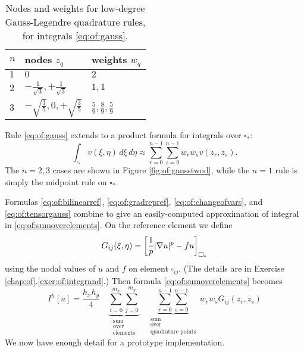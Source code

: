 \begin{table}[h]
\vspace{0.1in}

\begin{tabular}{lll}
$n$\phantom{foobar} & nodes $z_q$\phantom{foo} & weights $w_q$ \\ \hline
$1$ & $0$ & $2$ \\
$2$ & $-\frac{1}{\sqrt{3}}, +\frac{1}{\sqrt{3}}$ & $1,1$ \\
$3$ & $-\sqrt{\frac{3}{5}}, 0, +\sqrt{\frac{3}{5}}$ & $\frac{5}{9}, \frac{8}{9}, \frac{5}{9}$ \\
\end{tabular}

\vspace{0.1in}
\caption{Nodes and weights for low-degree Gauss-Legendre quadrature rules, for integrals \eqref{eq:of:gauss}.} \label{tab:of:gauss}
\end{table}

Rule \eqref{eq:of:gauss} extends to a product formula for integrals over $\square_\ast$:
\begin{equation}
\int_{\square_\ast} v(\xi,\eta) \,d\xi\,d\eta \approx \sum_{r=0}^{n-1} \sum_{s=0}^{n-1} w_r w_s v(z_r,z_s).  \label{eq:of:tensorgauss}
\end{equation}
The $n=2,3$ cases are shown in Figure \ref{fig:of:gausstwod}, while the $n=1$ rule is simply the midpoint rule on $\square_\ast$.

Formulas \eqref{eq:of:bilinearref}, \eqref{eq:of:gradrepref}, \eqref{eq:of:changeofvars}, and \eqref{eq:of:tensorgauss} combine to give an easily-computed approximation of integral in \eqref{eq:of:sumoverelements}.  On the reference element we define
\begin{equation}
G_{ij}(\xi,\eta) = \left[\frac{1}{p} |\nabla u|^p - fu\right]_{\square_\ast} \label{eq:of:integrandheuristic}
\end{equation}
using the nodal values of $u$ and $f$ on element $\square_{ij}$.  (The details are in Exercise \ref{chap:of}.\ref{exer:of:integrand}.)  Then formula \eqref{eq:of:sumoverelements} becomes
\begin{equation}
I^h[u] = \frac{h_x h_y}{4} \quad \underbrace{\sum_{i=0}^{m_x} \sum_{j=0}^{m_y}}_{\begin{smallmatrix} \text{sum} \\ \text{over} \\ \text{elements} \end{smallmatrix}} \quad \underbrace{\sum_{r=0}^{n-1} \sum_{s=0}^{n-1}}_{\begin{smallmatrix} \text{sum} \\ \text{over} \\ \text{quadrature points} \end{smallmatrix}} \, w_r w_s G_{ij}(z_r,z_s) \label{eq:of:quadraturesumoverelements}
\end{equation}
We now have enough detail for a prototype implementation.

